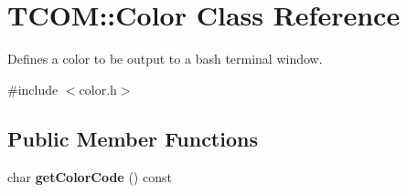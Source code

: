 \hypertarget{class_t_c_o_m_1_1_color}{\section{T\-C\-O\-M\-:\-:Color Class Reference}
\label{class_t_c_o_m_1_1_color}
}


Defines a color to be output to a bash terminal window.  




{\ttfamily \#include $<$color.\-h$>$}

\subsection*{Public Member Functions}
\begin{DoxyCompactItemize}
\item 
\hypertarget{class_t_c_o_m_1_1_color_a2cd5517c931f5ee485a49ab82d6b3440}{char {\bfseries get\-Color\-Code} () const }\label{class_t_c_o_m_1_1_color_a2cd5517c931f5ee485a49ab82d6b3440}

\end{DoxyCompactItemize}
